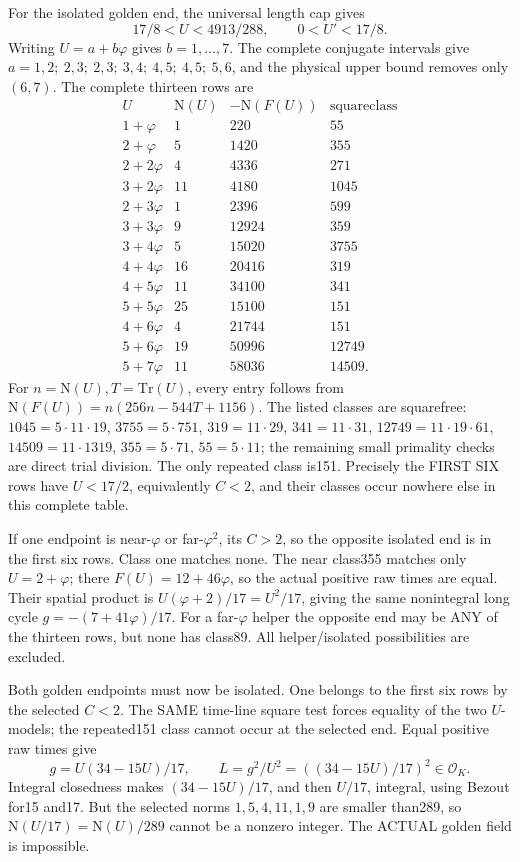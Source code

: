 For the isolated golden end, the universal length cap gives
\[
                       17/8<U<4913/288,\qquad0<U'<17/8 .
\]
Writing \(U=a+b\varphi\) gives \(b=1,\ldots,7\).
The complete conjugate intervals give
\(a=1,2;\ 2,3;\ 2,3;\ 3,4;\ 4,5;\ 4,5;\ 5,6\),
and the physical upper bound removes only \((6,7)\).
The complete thirteen rows are
\[
\begin{array}{c|r|r|r}
U&\mathrm N(U)&-\mathrm N(F(U))&\text{squareclass}\\ \hline
1+\varphi&1&220&55\\
2+\varphi&5&1420&355\\
2+2\varphi&4&4336&271\\
3+2\varphi&11&4180&1045\\
2+3\varphi&1&2396&599\\
3+3\varphi&9&12924&359\\
3+4\varphi&5&15020&3755\\
4+4\varphi&16&20416&319\\
4+5\varphi&11&34100&341\\
5+5\varphi&25&15100&151\\
4+6\varphi&4&21744&151\\
5+6\varphi&19&50996&12749\\
5+7\varphi&11&58036&14509 .
\end{array}
\]
For \(n=\mathrm N(U),T=\mathrm{Tr}(U)\), every entry follows from
\(\mathrm N(F(U))=n(256n-544T+1156)\).
The listed classes are squarefree:
\(1045=5\cdot11\cdot19\), \(3755=5\cdot751\),
\(319=11\cdot29\), \(341=11\cdot31\),
\(12749=11\cdot19\cdot61\), \(14509=11\cdot1319\),
\(355=5\cdot71\), \(55=5\cdot11\);
the remaining small primality checks are direct trial division.
The only repeated class is151.
Precisely the FIRST SIX rows have \(U<17/2\), equivalently \(C<2\),
and their classes occur nowhere else in this complete table.

If one endpoint is near-\(\varphi\) or far-\(\varphi^2\),
its \(C>2\), so the opposite isolated end is in the first six rows.
Class one matches none.
The near class355 matches only \(U=2+\varphi\);
there \(F(U)=12+46\varphi\), so the actual positive raw
times are equal.
Their spatial product is \(U(\varphi+2)/17=U^2/17\),
giving the same nonintegral long cycle
\(g=-(7+41\varphi)/17\).
For a far-\(\varphi\) helper the opposite end may be ANY of
the thirteen rows, but none has class89.
All helper/isolated possibilities are excluded.

Both golden endpoints must now be isolated.
One belongs to the first six rows by the selected \(C<2\).
The SAME time-line square test forces equality of the two
\(U\)-models; the repeated151 class cannot occur at the selected end.
Equal positive raw times give
\[
 g=U(34-15U)/17,\qquad
 L=g^2/U^2=((34-15U)/17)^2\in\mathcal O_K .
\]
Integral closedness makes \((34-15U)/17\), and then \(U/17\),
integral, using Bezout for15 and17.
But the selected norms \(1,5,4,11,1,9\) are smaller than289,
so \(\mathrm N(U/17)=\mathrm N(U)/289\) cannot be a
nonzero integer.
The ACTUAL golden field is impossible.


